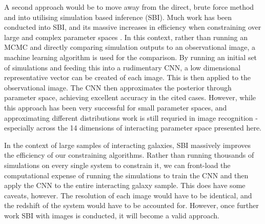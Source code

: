 A second approach would be to move away from the direct, brute force method and into utilising simulation based inference (SBI). Much work has been conducted into SBI, and its massive increases in efficiency when constraining over large and complex parameter spaces \citep[for an excellent describtion of likelihood free inference, see][]{2021MNRAS.501..954J}. In this context, rather than running an MCMC and directly comparing simulation outputs to an observational image, a machine learning algorithm is used for the comparison. By running an initial set of simulations and feeding this into a rudimentary CNN, a low dimensional representative vector can be created of each image. This is then applied to the observational image. The CNN then approximates the posterior through parameter space, achieving excellent accuracy in the cited cases. However, while this approach has been very successful for small parameter spaces, and approximating different distributions work is still requried in image recognition - especially across the 14 dimensions of interacting parameter space presented here. 

In the context of large samples of interacting galaxies, SBI massively improves the efficiency of our constraining algorithms. Rather than running thousands of simulations on every single system to constrain it, we can front-load the computational expense of running the simulations to train the CNN and then apply the CNN to the entire interacting galaxy sample. This does have some caveats, however. The resolution of each image would have to be identical, and the redshift of the system would have to be accounted for. However, once further work SBI with images is conducted, it will become a valid approach. 